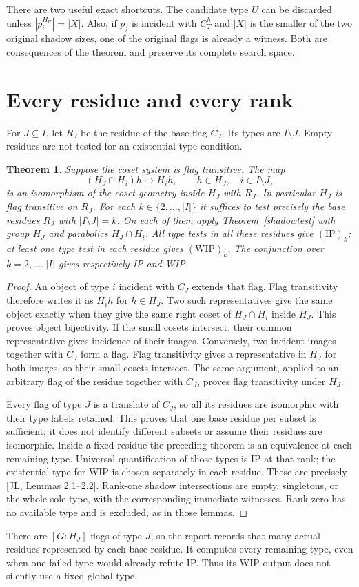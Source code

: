 \documentclass[11pt]{article}
\newtheorem{theorem}{Theorem}
\begin{document}
There are two useful exact shortcuts. The candidate type $U$ can be
discarded unless $|p_i^{H_U}|=|X|$. Also, if $p_j$ is incident with
$C_T^h$ and $|X|$ is the smaller of the two original shadow sizes, one
of the original flags is already a witness. Both are consequences of
the theorem and preserve its complete search space.


\section{Every residue and every rank}
For $J\subseteq I$, let $R_J$ be the residue of the base flag $C_J$.
Its types are $I\setminus J$. Empty residues are not tested for an
existential type condition.
\begin{theorem}\label{residue}
Suppose the coset system is flag transitive. The map
\[
 (H_J\cap H_i)h\longmapsto H_i h,\qquad h\in H_J,
 \quad i\in I\setminus J,
\]
is an isomorphism of the coset geometry inside $H_J$ with $R_J$.
In particular $H_J$ is flag transitive on $R_J$.
For each $k\in\{2,\ldots,|I|\}$ it suffices to test precisely the base
residues $R_J$ with $|I\setminus J|=k$. On each of them apply
Theorem~\ref{shadowtest} with group $H_J$ and parabolics $H_J\cap H_i$.
All type tests in all these residues give $(\mathrm{IP})_k$;
at least one type test in each residue gives $(\mathrm{WIP})_k$.
The conjunction over $k=2,\ldots,|I|$ gives respectively IP and WIP.
\end{theorem}
\begin{proof}
An object of type $i$ incident with $C_J$ extends that flag. Flag
transitivity therefore writes it as $H_i h$ for $h\in H_J$. Two such
representatives give the same object exactly when they give the same
right coset of $H_J\cap H_i$ inside $H_J$. This proves object bijectivity.
If the small cosets intersect, their common representative gives incidence
of their images. Conversely, two incident images together with $C_J$
form a flag. Flag transitivity gives a representative in $H_J$ for both
images, so their small cosets intersect. The same argument, applied to
an arbitrary flag of the residue together with $C_J$, proves flag
transitivity under $H_J$.

Every flag of type $J$ is a translate of $C_J$, so all its residues are
isomorphic with their type labels retained. This proves that one base
residue per subset is sufficient; it does not identify different subsets
or assume their residues are isomorphic. Inside a fixed residue the
preceding theorem is an equivalence at each remaining type. Universal
quantification of those types is IP at that rank; the existential type
for WIP is chosen separately in each residue. These are precisely
[JL, Lemmas 2.1--2.2]. Rank-one shadow intersections are empty, singletons,
or the whole sole type, with the corresponding immediate witnesses.
Rank zero has no available type and is excluded, as in those lemmas.
\end{proof}
There are $[G:H_J]$ flags of type $J$, so the report records that many
actual residues represented by each base residue. It computes every
remaining type, even when one failed type would already refute IP.
Thus its WIP output does not silently use a fixed global type.
\end{document}
